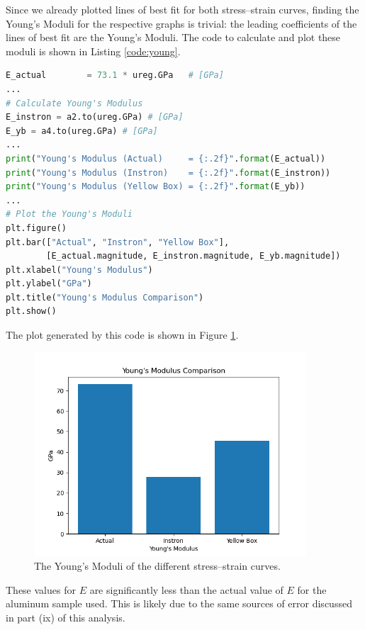 \documentclass[12 pt]{report}
\begin{document}
\begin{parlist}
	\item Since we already plotted lines of best fit for both stress--strain curves, finding the Young's Moduli for the respective graphs is trivial: the leading coefficients of the lines of best fit are the Young's Moduli. The code to calculate and plot these moduli is shown in Listing \ref{code:young}.
	
	\begin{lstlisting}[label={code:young}, caption={The code used to calculate and plot the Young's Moduli of the two stress--strain curves.},language=Python]
E_actual        = 73.1 * ureg.GPa   # [GPa]
...
# Calculate Young's Modulus
E_instron = a2.to(ureg.GPa) # [GPa]
E_yb = a4.to(ureg.GPa) # [GPa]
...
print("Young's Modulus (Actual)     = {:.2f}".format(E_actual))
print("Young's Modulus (Instron)    = {:.2f}".format(E_instron))
print("Young's Modulus (Yellow Box) = {:.2f}".format(E_yb))
...
# Plot the Young's Moduli
plt.figure()
plt.bar(["Actual", "Instron", "Yellow Box"],
        [E_actual.magnitude, E_instron.magnitude, E_yb.magnitude])
plt.xlabel("Young's Modulus")
plt.ylabel("GPa")
plt.title("Young's Modulus Comparison")
plt.show()\end{lstlisting}
\end{parlist}

	The plot generated by this code is shown in Figure \ref{fig:young}.
	
	\begin{figure}[htbp]
		\centering
		\includegraphics[width=4in]{images/graphs/Youngs Moduli}
		\caption{The Young's Moduli of the different stress--strain curves.}
		\label{fig:young}
	\end{figure}
	
	These values for $E$ are significantly less than the actual value of $E$ for the aluminum sample used. This is likely due to the same sources of error discussed in part (ix) of this analysis.
\end{document}
